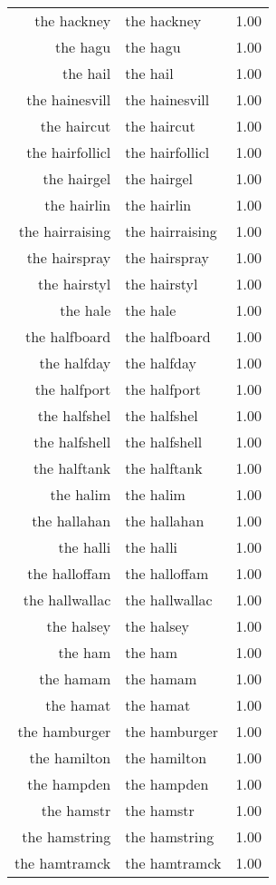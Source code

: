 \begin{table}[ht]
\begin{tabular}{rlr}
  the hackney & the hackney & 1.00 \\ 
  the hagu & the hagu & 1.00 \\ 
  the hail & the hail & 1.00 \\ 
  the hainesvill & the hainesvill & 1.00 \\ 
  the haircut & the haircut & 1.00 \\ 
  the hairfollicl & the hairfollicl & 1.00 \\ 
  the hairgel & the hairgel & 1.00 \\ 
  the hairlin & the hairlin & 1.00 \\ 
  the hairraising & the hairraising & 1.00 \\ 
  the hairspray & the hairspray & 1.00 \\ 
  the hairstyl & the hairstyl & 1.00 \\ 
  the hale & the hale & 1.00 \\ 
  the halfboard & the halfboard & 1.00 \\ 
  the halfday & the halfday & 1.00 \\ 
  the halfport & the halfport & 1.00 \\ 
  the halfshel & the halfshel & 1.00 \\ 
  the halfshell & the halfshell & 1.00 \\ 
  the halftank & the halftank & 1.00 \\ 
  the halim & the halim & 1.00 \\ 
  the hallahan & the hallahan & 1.00 \\ 
  the halli & the halli & 1.00 \\ 
  the halloffam & the halloffam & 1.00 \\ 
  the hallwallac & the hallwallac & 1.00 \\ 
  the halsey & the halsey & 1.00 \\ 
  the ham & the ham & 1.00 \\ 
  the hamam & the hamam & 1.00 \\ 
  the hamat & the hamat & 1.00 \\ 
  the hamburger & the hamburger & 1.00 \\ 
  the hamilton & the hamilton & 1.00 \\ 
  the hampden & the hampden & 1.00 \\ 
  the hamstr & the hamstr & 1.00 \\ 
  the hamstring & the hamstring & 1.00 \\ 
  the hamtramck & the hamtramck & 1.00 \\ 

\end{tabular}
\end{table}
